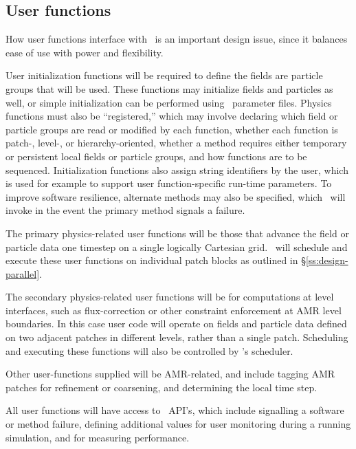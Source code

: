 \documentclass[10pt,twocolumn]{article}
\begin{document}
\subsection{User functions} \label{ss:design-user}

How user functions interface with \cello\ is an important design
issue, since it balances ease of use with power and flexibility.  

User initialization functions will be required to define the fields
are particle groups that will be used.  These functions may initialize
fields and particles as well, or simple initialization can be
performed using \cello\ parameter files.  Physics functions must also
be ``registered,'' which may involve declaring which field or particle
groups are read or modified by each function, whether each function is
patch-, level-, or hierarchy-oriented, whether a method requires
either temporary or persistent local fields or particle groups, and
how functions are to be sequenced.  Initialization functions also
assign string identifiers by the user, which is used for example to
support user function-specific run-time parameters.  To improve
software resilience, alternate methods may also be specified, which
\cello\ will invoke in the event the primary method signals a failure.

The primary physics-related user functions will be those that advance
the field or particle data one timestep on a single logically
Cartesian grid.  \cello\ will schedule and execute these user
functions on individual patch blocks as outlined in
\S\ref{ss:design-parallel}.  

The secondary physics-related user functions will be for computations
at level interfaces, such as flux-correction or other constraint
enforcement at AMR level boundaries.  In this case user code will
operate on fields and particle data defined on two adjacent patches in
different levels, rather than a single patch.  Scheduling and
executing these functions will also be controlled by \cello's scheduler.

Other user-functions supplied will be AMR-related, and include tagging
AMR patches for refinement or coarsening, and determining the local
time step.

All user functions will have access to \cello\ API's, which include
signalling a software or method failure, defining additional
values for user monitoring during a running simulation, and for
measuring performance.
\end{document}
